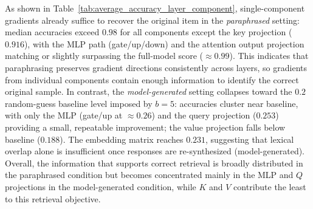 \noindent As shown in Table~\ref{tab:average_accuracy_layer_component}, single-component gradients already suffice to recover the original item in the \emph{paraphrased} setting: median accuracies exceed $0.98$ for all components except the key projection ($0.916$), with the MLP path (gate/up/down) and the attention output projection matching or slightly surpassing the full-model score ($\approx 0.99$). This indicates that paraphrasing preserves gradient directions consistently across layers, so gradients from individual components contain enough information to identify the correct original sample. In contrast, the \emph{model-generated} setting collapses toward the $0.2$ random-guess baseline level imposed by $b{=}5$: accuracies cluster near baseline, with only the MLP (gate/up at $\approx 0.26$) and the query projection ($0.253$) providing a small, repeatable improvement; the value projection falls below baseline ($0.188$). The embedding matrix reaches $0.231$, suggesting that lexical overlap alone is insufficient once responses are re-synthesized (model-generated). Overall, the information that supports correct retrieval is broadly distributed in the paraphrased condition but becomes concentrated mainly in the MLP and $Q$ projections in the model-generated condition, while $K$ and $V$ contribute the least to this retrieval objective.

